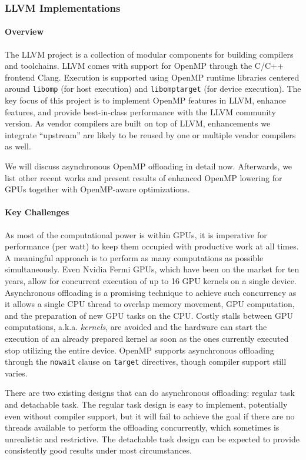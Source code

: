 \subsubsection{ LLVM Implementations }

\paragraph{Overview}
The LLVM project is a collection of modular components for building compilers and toolchains.
LLVM comes with support for OpenMP through the C/C++ frontend Clang.
Execution is supported using OpenMP runtime libraries centered around \lstinline{libomp} (for host execution) and \lstinline{libomptarget} (for device execution).
The key focus of this project is to implement OpenMP features in LLVM, enhance features, and provide best-in-class performance with the LLVM community version.
As vendor compilers are built on top of LLVM, enhancements we integrate ``upstream'' are likely to be reused
by one or multiple vendor compilers as well.

We will discuss asynchronous OpenMP offloading in detail now.
Afterwards, we list other recent works and present results of enhanced
OpenMP lowering for GPUs together with OpenMP-aware optimizations.

\paragraph{Key Challenges}

As most of the computational power is within GPUs, it is imperative for performance (per watt) to keep them occupied with productive work at all times.
A meaningful approach is to perform as many computations as possible simultaneously.
Even Nvidia Fermi GPUs, which have been on the market for ten years, allow for concurrent execution of up to 16 GPU kernels on a single device.
Asynchronous offloading is a promising technique to achieve such concurrency as it allows a single CPU thread to overlap memory movement, GPU computation, and the preparation of new GPU tasks on the CPU.
Costly stalls between GPU computations, a.k.a. \emph{kernels}, are avoided and the hardware can start the execution of an already prepared kernel as soon as the ones currently executed stop utilizing the entire device.
OpenMP supports asynchronous offloading through the \lstinline|nowait| clause on \lstinline|target| directives, though compiler support still varies.

There are two existing designs that can do asynchronous offloading: regular task and detachable task.
The regular task design is easy to implement, potentially even without compiler support, but it will fail to achieve the goal if there are no threads available to perform the offloading concurrently, which sometimes is unrealistic and restrictive.
The detachable task design can be expected to provide consistently good results under most circumstances.

